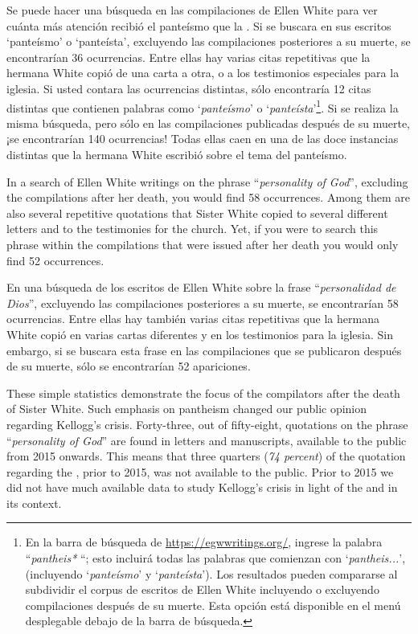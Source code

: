 Se puede hacer una búsqueda en las compilaciones de Ellen White para ver cuánta más atención recibió el panteísmo que la . Si se buscara en sus escritos ‘panteísmo’ o ‘panteísta’, excluyendo las compilaciones posteriores a su muerte, se encontrarían 36 ocurrencias. Entre ellas hay varias citas repetitivas que la hermana White copió de una carta a otra, o a los testimonios especiales para la iglesia. Si usted contara las ocurrencias distintas, sólo encontraría 12 citas distintas que contienen palabras como ‘\textit{panteísmo}’ o ‘\textit{panteísta}’\footnote{En la barra de búsqueda de \href{https://egwwritings.org/}{https://egwwritings.org/}, ingrese la palabra “\textit{pantheis*} “; esto incluirá todas las palabras que comienzan con ‘\textit{pantheis...}’, (incluyendo ‘\textit{panteísmo}’ y ‘\textit{panteísta}’). Los resultados pueden compararse al subdividir el corpus de escritos de Ellen White incluyendo o excluyendo compilaciones después de su muerte. Esta opción está disponible en el menú desplegable debajo de la barra de búsqueda.}. Si se realiza la misma búsqueda, pero sólo en las compilaciones publicadas después de su muerte, ¡se encontrarían 140 ocurrencias! Todas ellas caen en una de las doce instancias distintas que la hermana White escribió sobre el tema del panteísmo.


In a search of Ellen White writings on the phrase “\textit{personality of God}”, excluding the compilations after her death, you would find 58 occurrences. Among them are also several repetitive quotations that Sister White copied to several different letters and to the testimonies for the church. Yet, if you were to search this phrase within the compilations that were issued after her death you would only find 52 occurrences.


En una búsqueda de los escritos de Ellen White sobre la frase “\textit{personalidad de Dios}”, excluyendo las compilaciones posteriores a su muerte, se encontrarían 58 ocurrencias. Entre ellas hay también varias citas repetitivas que la hermana White copió en varias cartas diferentes y en los testimonios para la iglesia. Sin embargo, si se buscara esta frase en las compilaciones que se publicaron después de su muerte, sólo se encontrarían 52 apariciones.


These simple statistics demonstrate the focus of the compilators after the death of Sister White. Such emphasis on pantheism changed our public opinion regarding Kellogg’s crisis. Forty-three, out of fifty-eight, quotations on the phrase “\textit{personality of God}” are found in letters and manuscripts, available to the public from 2015 onwards. This means that three quarters (\textit{74 percent}) of the quotation regarding the , prior to 2015, was not available to the public. Prior to 2015 we did not have much available data to study Kellogg's crisis in light of the  and in its context.


